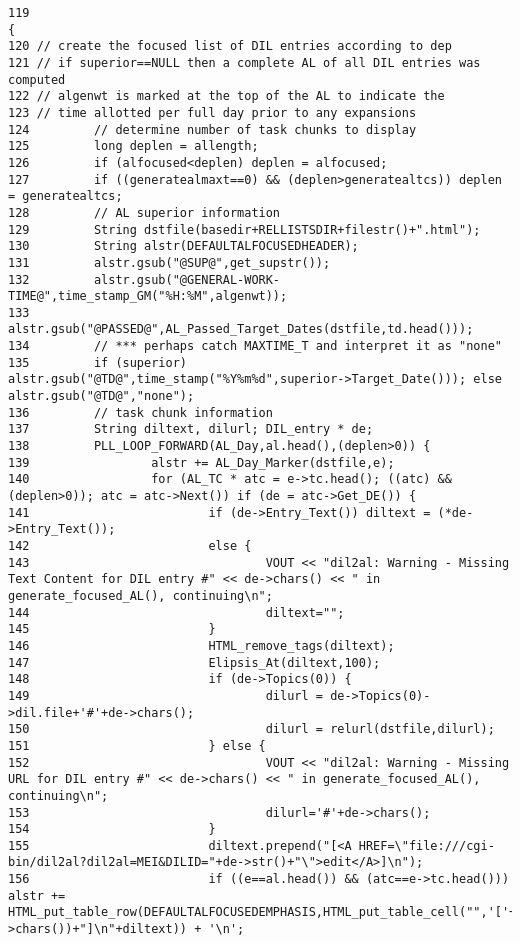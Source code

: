 \footnotesize\begin{verbatim}119                                                                           {
120 // create the focused list of DIL entries according to dep
121 // if superior==NULL then a complete AL of all DIL entries was computed
122 // algenwt is marked at the top of the AL to indicate the
123 // time allotted per full day prior to any expansions
124         // determine number of task chunks to display
125         long deplen = allength;
126         if (alfocused<deplen) deplen = alfocused;
127         if ((generatealmaxt==0) && (deplen>generatealtcs)) deplen = generatealtcs;
128         // AL superior information
129         String dstfile(basedir+RELLISTSDIR+filestr()+".html");
130         String alstr(DEFAULTALFOCUSEDHEADER);
131         alstr.gsub("@SUP@",get_supstr());
132         alstr.gsub("@GENERAL-WORK-TIME@",time_stamp_GM("%H:%M",algenwt));
133         alstr.gsub("@PASSED@",AL_Passed_Target_Dates(dstfile,td.head()));
134         // *** perhaps catch MAXTIME_T and interpret it as "none"
135         if (superior) alstr.gsub("@TD@",time_stamp("%Y%m%d",superior->Target_Date())); else alstr.gsub("@TD@","none");
136         // task chunk information
137         String diltext, dilurl; DIL_entry * de;
138         PLL_LOOP_FORWARD(AL_Day,al.head(),(deplen>0)) {
139                 alstr += AL_Day_Marker(dstfile,e);
140                 for (AL_TC * atc = e->tc.head(); ((atc) && (deplen>0)); atc = atc->Next()) if (de = atc->Get_DE()) {
141                         if (de->Entry_Text()) diltext = (*de->Entry_Text());
142                         else {
143                                 VOUT << "dil2al: Warning - Missing Text Content for DIL entry #" << de->chars() << " in generate_focused_AL(), continuing\n";
144                                 diltext="";
145                         }
146                         HTML_remove_tags(diltext);
147                         Elipsis_At(diltext,100);
148                         if (de->Topics(0)) {
149                                 dilurl = de->Topics(0)->dil.file+'#'+de->chars();
150                                 dilurl = relurl(dstfile,dilurl);
151                         } else {
152                                 VOUT << "dil2al: Warning - Missing URL for DIL entry #" << de->chars() << " in generate_focused_AL(), continuing\n";
153                                 dilurl='#'+de->chars();
154                         }
155                         diltext.prepend("[<A HREF=\"file:///cgi-bin/dil2al?dil2al=MEI&DILID="+de->str()+"\">edit</A>]\n");
156                         if ((e==al.head()) && (atc==e->tc.head())) alstr += HTML_put_table_row(DEFAULTALFOCUSEDEMPHASIS,HTML_put_table_cell("",'['+HTML_put_href(dilurl,de->chars())+"]\n"+diltext)) + '\n';

\end{verbatim}
